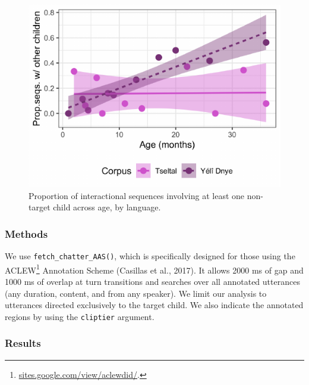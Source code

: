 \documentclass[10pt, letterpaper]{article}
\newenvironment{CodeChunk}{}{}
\begin{document}
\begin{CodeChunk}
\begin{figure}[h!]

{\centering \includegraphics{figs/tseyel.is.fig-1} 

}

\caption[Proportion of interactional sequences involving at least one non-target child across age, by language]{Proportion of interactional sequences involving at least one non-target child across age, by language.}\label{fig:tseyel.is.fig}
\end{figure}
\end{CodeChunk}

\hypertarget{methods}{%
\subsubsection{Methods}\label{methods}}

We use \texttt{fetch\_chatter\_AAS()}, which is specifically designed
for those using the ACLEW\footnote{\href{https://sites.google.com/view/aclewdid/home}{sites.google.com/view/aclewdid/}.}
Annotation Scheme (Casillas et al., 2017). It allows 2000 ms of gap and
1000 ms of overlap at turn transitions and searches over all annotated
utterances (any duration, content, and from any speaker). We limit our
analysis to utterances directed exclusively to the target child. We also
indicate the annotated regions by using the \texttt{cliptier} argument.

\hypertarget{results}{%
\subsubsection{Results}\label{results}}
\end{document}
